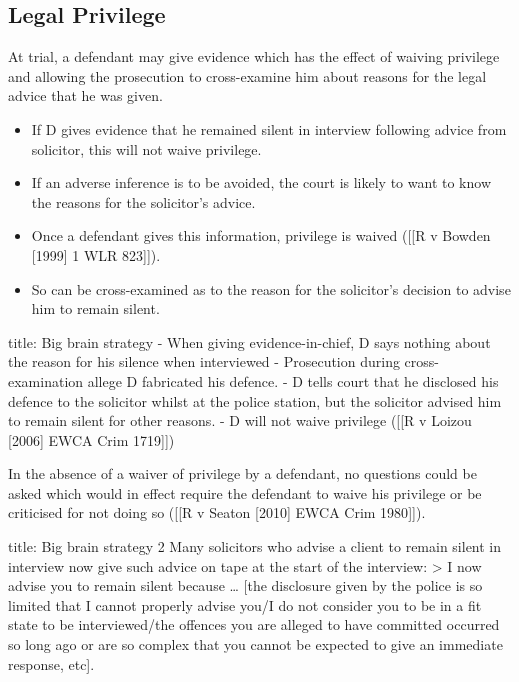 \documentclass[
]{article}
\newenvironment{Shaded}{}{}
\newcommand{\NormalTok}[1]{#1}
\providecommand{\tightlist}{%
  \setlength{\itemsep}{0pt}\setlength{\parskip}{0pt}}
\begin{document}
\hypertarget{legal-privilege}{%
\subsection{Legal Privilege}\label{legal-privilege}}

At trial, a defendant may give evidence which has the effect of waiving
privilege and allowing the prosecution to cross-examine him about
reasons for the legal advice that he was given.

\begin{itemize}
\tightlist
\item
  If D gives evidence that he remained silent in interview following
  advice from solicitor, this will not waive privilege.
\item
  If an adverse inference is to be avoided, the court is likely to want
  to know the reasons for the solicitor's advice.
\item
  Once a defendant gives this information, privilege is waived ({[}{[}R
  v Bowden {[}1999{]} 1 WLR 823{]}{]}).
\item
  So can be cross-examined as to the reason for the solicitor's decision
  to advise him to remain silent.
\end{itemize}

\begin{Shaded}
\begin{Highlighting}[]
\NormalTok{title: Big brain strategy}
\NormalTok{{-} When giving evidence{-}in{-}chief, D says nothing about the reason for his silence when interviewed}
\NormalTok{{-} Prosecution during cross{-}examination allege D fabricated his defence. }
\NormalTok{{-} D tells court that he disclosed his defence to the solicitor whilst at the police station, but the solicitor advised him to remain silent for other reasons. }
\NormalTok{{-} D will not waive privilege ([[R v Loizou [2006] EWCA Crim 1719]])}
\end{Highlighting}
\end{Shaded}

In the absence of a waiver of privilege by a defendant, no questions
could be asked which would in effect require the defendant to waive his
privilege or be criticised for not doing so ({[}{[}R v Seaton {[}2010{]}
EWCA Crim 1980{]}{]}).

\begin{Shaded}
\begin{Highlighting}[]
\NormalTok{title: Big brain strategy 2}
\NormalTok{Many solicitors who advise a client to remain silent in interview now give such advice on tape at the start of the interview:}
\NormalTok{\textgreater{} I now advise you to remain silent because … [the disclosure given by the police is so limited that I cannot properly advise you/I do not consider you to be in a fit state to be interviewed/the offences you are alleged to have committed occurred so long ago or are so complex that you cannot be expected to give an immediate response, etc].}
\end{Highlighting}
\end{Shaded}
\end{document}
